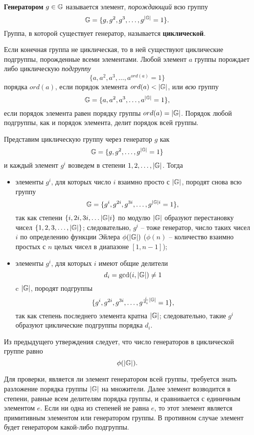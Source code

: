 \textbf{Генератором} $g \in \mathbb{G}$ называется элемент, \emph{порождающий} всю группу
    \[ \mathbb{G} = \{g, g^2, g^3,  \ldots,  g^{|\mathbb{G}|} = 1\}. \]
Группа, в которой существует генератор, называется \textbf{циклической}.

Если конечная группа не циклическая, то в ней существуют циклические подгруппы, порожденные всеми элементами. Любой элемент $a$ группы порождает либо циклическую \emph{подгруппу}
    \[ \{ a, a^2, a^3,  \dots,  a^{ord(a)} = 1 \} \]
порядка $ord(a)$, если порядок элемента $ord(a) < |\mathbb{G}|$, или \emph{всю} группу
    \[ \mathbb{G} = \{ a, a^2, a^3,  \dots,  a^{|\mathbb{G}|} = 1 \}, \]
если порядок элемента равен порядку группы $ord(a) = |\mathbb{G}|$. Порядок любой подгруппы, как и порядок элемента, делит порядок всей группы.

Представим циклическую группу через генератор $g$ как
    \[ \mathbb{G} = \{g, g^2,  \ldots,  g^{|\mathbb{G}|} = 1\} \]
и  каждый элемент $g^i$  возведем в степени $1, 2,  \ldots,  |\mathbb{G}|$. Тогда
\begin{itemize}
    \item элементы $g^i$, для которых число $i$ взаимно просто с $|\mathbb{G}|$, породят снова всю группу
            \[ \mathbb{G} = \{ g^i, g^{2i}, g^{3i},  \dots,  g^{|\mathbb{G}| i} = 1 \}, \]
        так как степени $\{i, 2i, 3i, \dots |\mathbb{G}| i \}$ по модулю $|\mathbb{G}|$ образуют перестановку чисел $\{1, 2, 3, \dots, |\mathbb{G}|\}$; следовательно, $g^i$ -- тоже генератор, число таких чисел $i$ по определению функции Эйлера $\phi(|\mathbb{G}|)$ ($\phi(n)$ -- количество взаимно простых с $n$ целых чисел в диапазоне $[1,n-1]$);
    \item элементы $g^i$, для которых $i$ имеют общие делители
            \[ d_i = \gcd(i, |\mathbb{G}|) \neq 1 \]
        c $|\mathbb{G}|$, породят подгруппы
            \[ \{ g^i, g^{2i}, g^{3i},  \dots,  g^{\frac{i}{d_i} |\mathbb{G}|} = 1\}, \]
        так как степень последнего элемента кратна $|\mathbb{G}|$; следовательно, такие $g^i$ образуют циклические подгруппы порядка $d_i$.
\end{itemize}

Из предыдущего утверждения следует, что число генераторов в циклической группе равно
    \[ \phi(|\mathbb{G}|). \]

Для проверки, является ли элемент генератором всей группы, требуется знать разложение порядка группы $|\mathbb{G}|$ на множители. Далее элемент возводится в степени, равные всем делителям порядка группы, и сравнивается с единичным элементом $e$. Если ни одна из степеней не равна $e$, то этот элемент является примитивным элементом или генератором группы. В противном случае элемент будет генератором какой-либо подгруппы.

